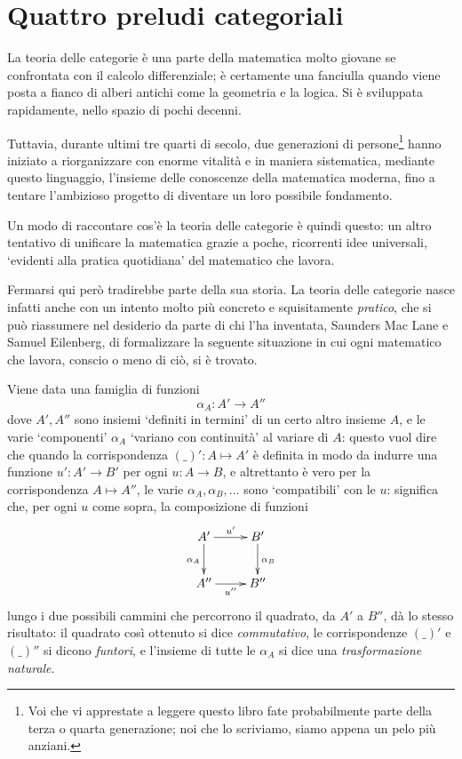 \chapter{Quattro preludi categoriali}
La teoria delle categorie è una parte della matematica molto giovane se confrontata con il calcolo differenziale; è certamente una fanciulla quando viene posta a fianco di alberi antichi come la geometria e la logica. Si è sviluppata rapidamente, nello spazio di pochi decenni.

Tuttavia, durante ultimi tre quarti di secolo, due generazioni di persone\footnote{Voi che vi apprestate a leggere questo libro fate probabilmente parte della terza o quarta generazione; noi che lo scriviamo, siamo appena un pelo più anziani.} hanno iniziato a riorganizzare  con enorme vitalità e in maniera sistematica, mediante questo linguaggio, l'insieme delle conoscenze della matematica moderna, fino a tentare l'ambizioso progetto di diventare un loro possibile fondamento.

\medskip
Un modo di raccontare cos'è la teoria delle categorie è quindi questo: un altro tentativo di unificare la matematica grazie a poche, ricorrenti idee universali, `evidenti alla pratica quotidiana' del matematico che lavora.

Fermarsi qui però tradirebbe parte della sua storia. La teoria delle categorie nasce infatti anche con un intento molto più concreto e squisitamente \emph{pratico}, che si può riassumere nel desiderio da parte di chi l'ha inventata, Saunders Mac Lane e Samuel Eilenberg, di formalizzare la seguente situazione in cui ogni matematico che lavora, conscio o meno di ciò, si è trovato.

Viene data una famiglia di funzioni
\[\alpha_A : A' \to A'' \]
dove $A',A''$ sono insiemi `definiti in termini' di un certo altro insieme $A$, e le varie `componenti' $\alpha_A$ `variano con continuità' al variare di $A$: questo vuol dire che quando la corrispondenza $(\_)' : A\mapsto A'$ è definita in modo da indurre una funzione $u' : A' \to B'$ per ogni $u : A \to B$, e altrettanto è vero per la corrispondenza $A\mapsto A''$, le varie $\alpha_A, \alpha_B,\dots$ sono `compatibili' con le $u$: significa che, per ogni $u$ come sopra, la composizione di funzioni
\[
\vcenter{\xymatrix{
  A'\ar[r]^{u'}\ar[d]_{\alpha_A} & B'\ar[d]^{\alpha_B} \\
  A'' \ar[r]_{u''} & B''
}}
\]
lungo i due possibili cammini che percorrono il quadrato, da $A'$ a $B''$, dà lo stesso risultato: il quadrato così ottenuto si dice \emph{commutativo}, le corrispondenze $(\_)'$ e $(\_)''$ si dicono \emph{funtori}, e l'insieme di tutte le $\alpha_A$ si dice una \emph{trasformazione naturale}.

